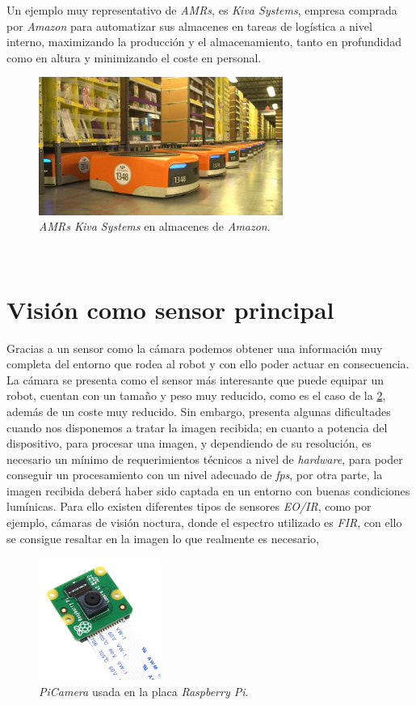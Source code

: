 Un ejemplo muy representativo de  \textit{AMRs}, es \textit{Kiva Systems}, empresa comprada por \textit{Amazon} para automatizar sus almacenes en tareas de logística a nivel interno, maximizando la producción y el almacenamiento, tanto en profundidad como en altura y minimizando el coste en personal.\\

\begin{figure} [h!]
	\begin{center}
		\includegraphics[width=8cm]{figs/kiva_systems}
	\end{center}
	\caption{\textit{AMRs Kiva Systems} en almacenes de \textit{Amazon}.}
	\label{fig:kiva_systems}
\end{figure}\

\section{Visión como sensor principal}
\label{sec:vision}
Gracias a un sensor como la cámara podemos obtener una información muy completa del entorno que rodea al robot y con ello poder actuar en consecuencia. La cámara se presenta como el sensor más interesante que puede equipar un robot, cuentan con un tamaño y peso muy reducido, como es el caso de la \ref{fig:picamera}, además de un coste muy reducido. Sin embargo, presenta algunas dificultades cuando nos disponemos a tratar la imagen recibida; en cuanto a potencia del dispositivo, para procesar una imagen, y dependiendo de su resolución, es necesario un mínimo de requerimientos técnicos a nivel de \textit{hardware}, para poder conseguir un procesamiento con un nivel adecuado de \textit{fps}, por otra parte, la imagen recibida deberá haber sido captada en un entorno con buenas condiciones lumínicas. Para ello existen diferentes tipos de sensores \textit{EO/IR}, como por ejemplo, cámaras de visión noctura, donde el espectro utilizado es \textit{FIR}, con ello se consigue resaltar en la imagen lo que realmente es necesario,

\begin{figure} [h!]
	\begin{center}
		\includegraphics[width=4cm]{figs/picamera}
	\end{center}
	\caption{\textit{PiCamera} usada en la placa \textit{Raspberry Pi}.}
	\label{fig:picamera}
\end{figure}\

